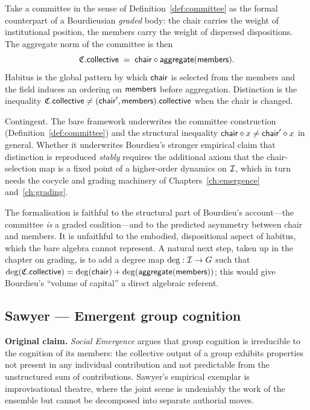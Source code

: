\formalclaim
Take a committee in the sense of Definition~\ref{def:committee} as
the formal counterpart of a Bourdieusian \emph{graded} body: the
chair carries the weight of institutional position, the members
carry the weight of dispersed dispositions. The aggregate norm of
the committee is then
\[
  \mathfrak{C}.\mathsf{collective} \;=\; \mathsf{chair} \mathbin{\diamond} \mathsf{aggregate}(\mathsf{members}).
\]
Habitus is the global pattern by which $\mathsf{chair}$ is selected from the
members and the field induces an ordering on $\mathsf{members}$ before
aggregation. Distinction is the inequality
$\mathfrak{C}.\mathsf{collective} \neq (\mathsf{chair}', \mathsf{members}).\mathsf{collective}$ when the
chair is changed.

\formalstatus
Contingent. The bare framework underwrites the committee
construction (Definition~\ref{def:committee}) and the structural
inequality $\mathsf{chair} \mathbin{\diamond} x \neq \mathsf{chair}' \mathbin{\diamond} x$ in general.
Whether it underwrites Bourdieu's stronger empirical claim that
distinction is reproduced \emph{stably} requires the additional
axiom that the chair-selection map is a fixed point of a higher-order
dynamics on $\mathcal{I}$, which in turn needs the cocycle and grading
machinery of Chapters~\ref{ch:emergence} and~\ref{ch:grading}.

\litcomment
The formalisation is faithful to the structural part of Bourdieu's
account---the committee \emph{is} a graded coalition---and to the
predicted asymmetry between chair and members. It is unfaithful to
the embodied, dispositional aspect of habitus, which the bare
algebra cannot represent. A natural next step, taken up
in the chapter on grading, is to add a degree map $\deg : \mathcal{I} \to
G$ such that $\deg(\mathfrak{C}.\mathsf{collective}) = \deg(\mathsf{chair}) +
\deg(\mathsf{aggregate}(\mathsf{members}))$; this would give Bourdieu's ``volume of
capital'' a direct algebraic referent.

\subsection*{Sawyer --- Emergent group cognition}

\begin{zooentry*}\end{zooentry*}

\textbf{Original claim.} \emph{Social Emergence}
\cite{Sawyer2005, SawyerEmergence2005} argues that group cognition
is irreducible to the cognition of its members: the collective
output of a group exhibits properties not present in any individual
contribution and not predictable from the unstructured sum of
contributions. Sawyer's empirical exemplar is improvisational
theatre, where the joint scene is undeniably the work of the
ensemble but cannot be decomposed into separate authorial moves.

